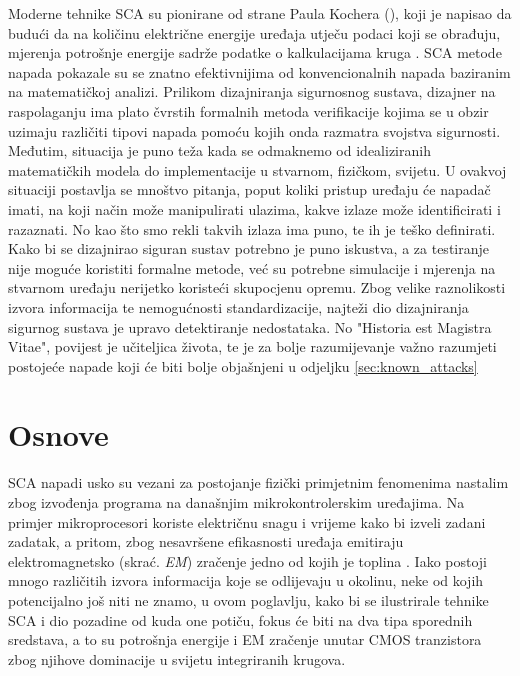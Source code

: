 \documentclass[times, utf8, diplomski]{fer}
\begin{document}
Moderne tehnike SCA su pionirane od strane Paula Kochera (\citeyear{kocher1996timing, kocher1999differential, kocher2004security}), koji je napisao da budući da na količinu električne energije uređaja utječu podaci koji se obrađuju, mjerenja potrošnje energije sadrže podatke o kalkulacijama kruga \citep{kocher2011introduction}. SCA metode napada pokazale su se znatno efektivnijima od konvencionalnih napada baziranim na matematičkoj analizi. Prilikom dizajniranja sigurnosnog sustava, dizajner na raspolaganju ima plato čvrstih formalnih metoda verifikacije kojima se u obzir uzimaju različiti tipovi napada pomoću kojih onda razmatra svojstva sigurnosti. Međutim, situacija je puno teža kada se odmaknemo od idealiziranih matematičkih modela do implementacije u stvarnom, fizičkom, svijetu. U ovakvoj situaciji postavlja se mnoštvo pitanja, poput koliki pristup uređaju će napadač imati, na koji način može manipulirati ulazima, kakve izlaze može identificirati i razaznati. No kao što smo rekli takvih izlaza ima puno, te ih je teško definirati. Kako bi se dizajnirao siguran sustav potrebno je puno iskustva, a za testiranje nije moguće koristiti formalne metode, već su potrebne simulacije i mjerenja na stvarnom uređaju nerijetko koristeći skupocjenu opremu. Zbog velike raznolikosti izvora informacija te nemogućnosti standardizacije, najteži dio dizajniranja sigurnog sustava je upravo detektiranje nedostataka. No "Historia est Magistra Vitae", povijest je učiteljica života, te je za bolje razumijevanje važno razumjeti postojeće napade koji će biti bolje objašnjeni u odjeljku \ref{sec:known_attacks}

\section{Osnove}

SCA napadi usko su vezani za postojanje fizički primjetnim fenomenima nastalim zbog izvođenja programa na današnjim mikrokontrolerskim uređajima. Na primjer mikroprocesori koriste električnu snagu i vrijeme kako bi izveli zadani zadatak, a pritom, zbog nesavršene efikasnosti uređaja emitiraju elektromagnetsko (skrać. \emph{EM}) zračenje jedno od kojih je toplina \citep{standaert2010introduction}. Iako postoji mnogo različitih izvora informacija koje se odlijevaju u okolinu, neke od kojih potencijalno još niti ne znamo, u ovom poglavlju, kako bi se ilustrirale tehnike SCA i dio pozadine od kuda one potiču, fokus će biti na dva tipa sporednih sredstava, a to su potrošnja energije i EM zračenje unutar CMOS tranzistora zbog njihove dominacije u svijetu integriranih krugova.
\end{document}
